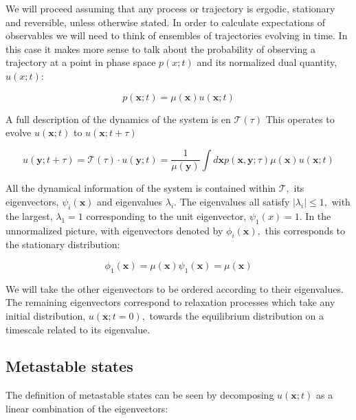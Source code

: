We will proceed assuming that any process or trajectory is ergodic, stationary and reversible, unless otherwise stated. In order to calculate expectations of observables we will need to think of ensembles of trajectories evolving in time. In this case it makes more sense to talk about the probability of observing a trajectory at a point in phase space $p(x;t)$ and its normalized dual quantity, $u(x;t)$: 

\begin{equation}
p(\mathbf{x} ; t)=\mu(\mathbf{x}) u(\mathbf{x} ; t)
\end{equation}

A full description of the dynamics of the system is en $\mathcal{T}(\tau)$ This operates to evolve $u(\mathbf{x} ; t)$ to $u(\mathbf{x} ; t+\tau)$

\begin{equation}
u(\mathbf{y} ; t+\tau)=\mathcal{T}(\tau) \cdot u(\mathbf{y} ; t)=\frac{1}{\mu(\mathbf{y})} \int d \mathbf{x} p(\mathbf{x}, \mathbf{y} ; \tau) \mu(\mathbf{x}) u(\mathbf{x} ; t)
\end{equation}

All the dynamical information of the system is contained within $\mathcal{T},$ its eigenvectors, $\psi_{i}(\mathbf{x})$ and eigenvalues $\lambda_{i} .$ The eigenvalues all satisfy $\left|\lambda_{i}\right| \leq 1,$ with the largest, $\lambda_{1}=1$ corresponding to the unit eigenvector, $\psi_{1}(x)=1 .$ In the unnormalized picture, with eigenvectors denoted by $\phi_{i}(\mathbf{x}),$ this corresponds to the stationary distribution:

\begin{equation}
\phi_{1}(\mathbf{x})=\mu(\mathbf{x}) \psi_{1}(\mathbf{x})=\mu(\mathbf{x})
\end{equation}

We will take the other eigenvectors to be ordered according to their eigenvalues. The remaining eigenvectors correspond to relaxation processes which take any initial distribution, $u(\mathbf{x} ; t=0),$ towards the equilibrium distribution on a timescale related to its eigenvalue.

\subsection{Metastable states}

The definition of metastable states can be seen by decomposing $u(\mathbf{x} ; t)$ as a linear combination of the eigenvectors:

